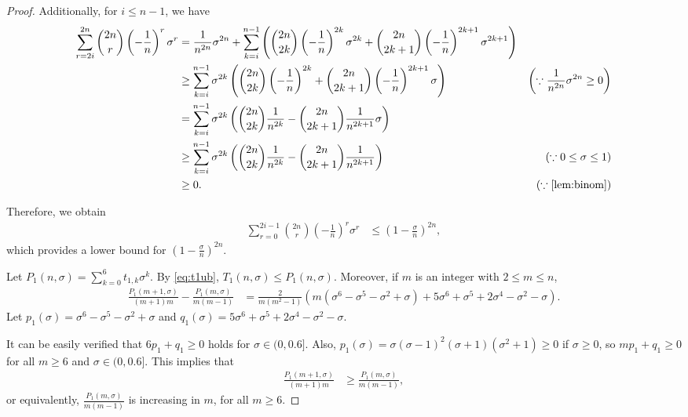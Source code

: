 \documentclass{article}
\theoremstyle{plain}
\theoremstyle{definition}
\theoremstyle{remark}
\def\bigopen#1{\left(#1\right)}
\begin{document}
\begin{proof}
Additionally, for $i\le n-1$, we have
\begin{align*}
    \sum_{r=2i}^{2n} \binom{2n}{r}\bigopen{ -\frac{1}{n} }^r \sigma^r &= \frac{1}{n^{2n}}\sigma^{2n} + \sum_{k=i}^{n-1} \bigopen{\binom{2n}{2k}\bigopen{ -\frac{1}{n} }^{2k}\sigma^{2k} + \binom{2n}{2k+1}\bigopen{-\frac{1}{n} }^{2k+1}\sigma^{2k+1}}\\
    &\ge \sum_{k=i}^{n-1} \sigma^{2k} \bigopen{\binom{2n}{2k}\bigopen{ -\frac{1}{n} }^{2k} + \binom{2n}{2k+1}\bigopen{ -\frac{1}{n} }^{2k+1}\sigma} & \bigopen{\because \frac{1}{n^{2n}}\sigma^{2n} \ge 0}\\
    &= \sum_{k=i}^{n-1} \sigma^{2k} \bigopen{\binom{2n}{2k} \frac{1}{n^{2k}} - \binom{2n}{2k+1}\frac{1}{n^{2k+1}}\sigma}\\
    &\ge \sum_{k=i}^{n-1} \sigma^{2k} \bigopen{\binom{2n}{2k} \frac{1}{n^{2k}} - \binom{2n}{2k+1}\frac{1}{n^{2k+1}}} & (\because 0\le \sigma\le 1)\\
    &\ge 0.  & (\because \text{\cref{lem:binom}})
\end{align*}

Therefore, we obtain
\begin{align}
    \sum_{r=0}^{2i-1} \binom{2n}{r}\bigopen{ -\frac{1}{n} }^r \sigma^r &\le \bigopen{ 1-\frac{\sigma}{n}}^{2n}, \label{eq:binomlb}
\end{align}
which provides a lower bound for $\bigopen{1-\frac{\sigma}{n}}^{2n}$.

Let $P_1(n, \sigma) = \sum_{k=0}^6 t_{1,k}\sigma^k$. By \cref{eq:t1ub}, $T_1(n, \sigma) \le P_1(n, \sigma)$. Moreover, if $m$ is an integer with $2\le m\le n$,
\begin{align}
    \label{eq:p1diff}
    \frac{P_{1}(m+1, \sigma)}{(m+1)m} - \frac{P_{1}(m, \sigma)}{m(m-1)} &= \frac{2}{m(m^2-1)} \bigopen{m (\sigma^6 - \sigma^5 - \sigma^2 + \sigma) + 5 \sigma^6 + \sigma^5 + 2 \sigma^4 - \sigma^2 - \sigma}.
\end{align}
Let $p_1(\sigma) = \sigma^6-\sigma^5-\sigma^2+\sigma$ and $q_1(\sigma) = 5 \sigma^{6} + \sigma^5 + 2 \sigma^4 - \sigma^2 - \sigma$. 

It can be easily verified that $6p_1 + q_1 \ge 0$ holds for $\sigma \in (0, 0.6]$. Also, $p_{1}(\sigma)=\sigma(\sigma-1)^2(\sigma+1)(\sigma^2+1)\ge 0$ if $\sigma\ge 0$, so $mp_{1}+q_{1}\ge 0$ for all $m\ge 6$ and $\sigma \in (0, 0.6]$.
This implies that
\begin{align*}
    \frac{P_{1}(m+1, \sigma)}{(m+1)m} &\ge \frac{P_{1}(m, \sigma)}{m(m-1)},
\end{align*}
or equivalently, $\frac{P_{1}(m, \sigma)}{m(m-1)}$ is increasing in $m$, for all $m\ge 6$. 


\end{proof}
\end{document}
